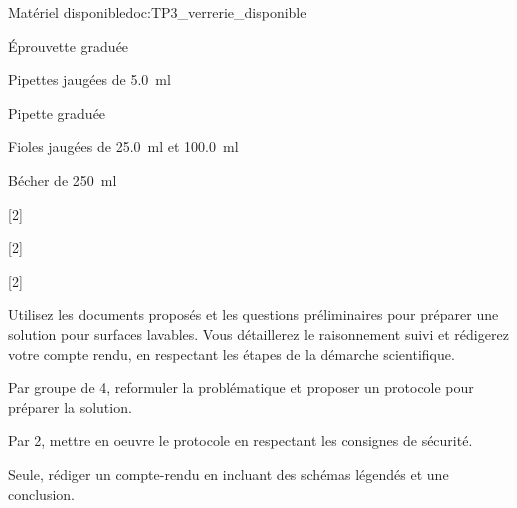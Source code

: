 \begin{doc}{Matériel disponible}{doc:TP3_verrerie_disponible}
  \begin{listePoints}[2]
    \item Éprouvette graduée
    \item Pipettes jaugées de \qty{5,0}{\ml}
    \item Pipette graduée
    \item Fioles jaugées de \qty{25,0}{\ml} et \qty{100,0}{\ml}
    \item Bécher de \qty{250}{\ml}
  \end{listePoints}
\end{doc}

\vspace*{-8pt}

[2]

[2]

[2]



\mesure
Utilisez les documents proposés et les questions préliminaires pour préparer une solution pour surfaces lavables.
Vous détaillerez le raisonnement suivi et rédigerez votre compte rendu, en respectant les étapes de la démarche scientifique.
\begin{protocole}
  \item Par groupe de 4, reformuler la problématique et proposer un protocole pour préparer la solution.
  \item Par 2, mettre en oeuvre le protocole en respectant les consignes de sécurité.
  \item Seule, rédiger un compte-rendu en incluant des schémas légendés et une conclusion.
\end{protocole}
